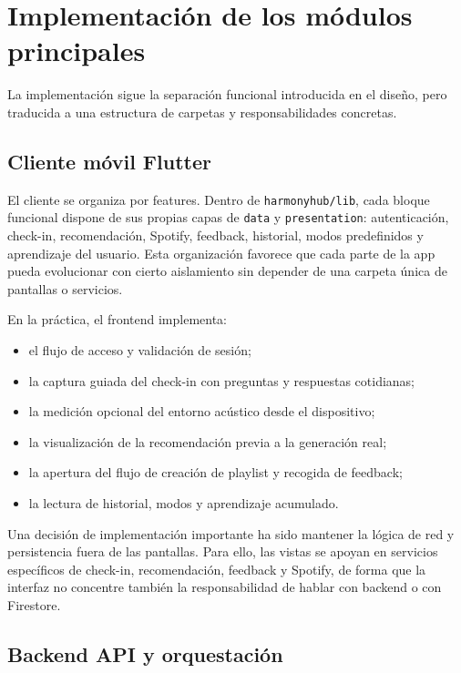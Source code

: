 \section{Implementación de los módulos principales}
\label{sec:implementacion_modulos}

La implementación sigue la separación funcional introducida en el diseño, pero
traducida a una estructura de carpetas y responsabilidades concretas.

\subsection{Cliente móvil Flutter}
\label{subsec:modulo_cliente_flutter}

El cliente se organiza por features. Dentro de \texttt{harmonyhub/lib},
cada bloque funcional dispone de sus propias capas de \texttt{data} y
\texttt{presentation}: autenticación, check-in, recomendación, Spotify,
feedback, historial, modos predefinidos y aprendizaje del usuario. Esta
organización favorece que cada parte de la app pueda evolucionar con cierto
aislamiento sin depender de una carpeta única de pantallas o servicios.

En la práctica, el frontend implementa:

\begin{itemize}
    \item el flujo de acceso y validación de sesión;
    \item la captura guiada del check-in con preguntas y respuestas cotidianas;
    \item la medición opcional del entorno acústico desde el dispositivo;
    \item la visualización de la recomendación previa a la generación real;
    \item la apertura del flujo de creación de playlist y recogida de feedback;
    \item la lectura de historial, modos y aprendizaje acumulado.
\end{itemize}

Una decisión de implementación importante ha sido mantener la lógica de red y
persistencia fuera de las pantallas. Para ello, las vistas se apoyan en
servicios específicos de check-in, recomendación, feedback y Spotify, de forma
que la interfaz no concentre también la responsabilidad de hablar con backend o
con Firestore.

\subsection{Backend API y orquestación}
\label{subsec:modulo_backend_api}

